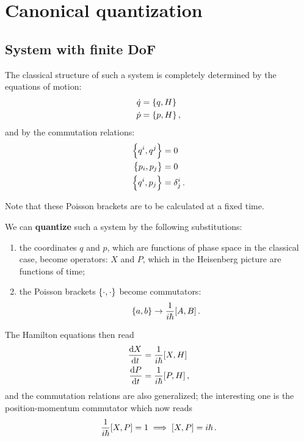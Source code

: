 \documentclass[main.tex]{subfiles}
\begin{document}
\section{Canonical quantization}

\subsection{System with finite DoF}


The classical structure of such a system is completely determined by the equations of motion: 
%
\begin{align}
\dot{q} &= \qty{q, H}  \\
\dot{p} &= \qty{p, H}
\,,
\end{align}
%
and by the commutation relations: 
%
\begin{align}
\qty{q^{i}, q^{j}} &= 0  \\
\qty{p_{i}, p_{j}} &= 0  \\
\qty{q^{i}, p_{j}} &= \delta_{j}^{i}
\,.
\end{align}

Note that these Poisson brackets are to be calculated at a fixed time. 

We can \textbf{quantize} such a system by the following substitutions: 
\begin{enumerate}
    \item the coordinates \(q\) and \(p\), which are functions of phase space in the classical case, become operators: \(X\) and \(P\), which in the Heisenberg picture are functions of time;
    \item the Poisson brackets \(\qty{\cdot, \cdot}\) become commutators: 
    \begin{align}
    \qty{a, b} \to \frac{1}{i \hbar} \qty[A, B]
    \,.
    \end{align}    
\end{enumerate}

The Hamilton equations then read 
%
\begin{align}
\dv{X}{t} &= \frac{1}{i \hbar} \qty[X, H] \\
\dv{P}{t} &= \frac{1}{i \hbar} \qty[P, H]
\,,
\end{align}
%
and the commutation relations are also generalized; the interesting one is the position-momentum commutator which now reads 
%
\begin{align}
\frac{1}{i \hbar} \qty[X,P] = 1 \implies
\qty[X, P] = i \hbar
\,.
\end{align}
\end{document}

